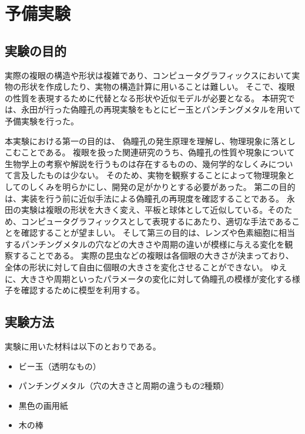 \chapter{予備実験}
\label{CExperiment}

\section{実験の目的}
\label{SExperimentPurpose}


実際の複眼の構造や形状は複雑であり、コンピュータグラフィックスにおいて実物の形状を作成したり、実物の構造計算に用いることは難しい。
そこで、複眼の性質を表現するために代替となる形状や近似モデルが必要となる。
本研究では、永田\cite{永田敏夫:2008-03-10}が行った偽瞳孔の再現実験をもとにビー玉とパンチングメタルを用いて予備実験を行った。

本実験における第一の目的は、 偽瞳孔の発生原理を理解し、物理現象に落としこむことである。
複眼を扱った関連研究のうち、偽瞳孔の性質や現象について生物学上の考察や解説を行うものは存在するものの、幾何学的なしくみについて言及したものは少ない。
そのため、実物を観察することによって物理現象としてのしくみを明らかにし、開発の足がかりとする必要があった。
第二の目的は、実装を行う前に近似手法による偽瞳孔の再現度を確認することである。
永田の実験は複眼の形状を大きく変え、平板と球体として近似している。そのため、コンピュータグラフィックスとして表現するにあたり、適切な手法であることを確認することが望ましい。
そして第三の目的は、レンズや色素細胞に相当するパンチングメタルの穴などの大きさや周期の違いが模様に与える変化を観察することである。
実際の昆虫などの複眼は各個眼の大きさが決まっており、全体の形状に対して自由に個眼の大きさを変化させることができない。
ゆえに、大きさや周期といったパラメータの変化に対して偽瞳孔の模様が変化する様子を確認するために模型を利用する。

\section{実験方法}
\label{SExperimentMethod}

実験に用いた材料は以下のとおりである。

\begin{itemize}
\item ビー玉（透明なもの）
\item パンチングメタル（穴の大きさと周期の違うもの2種類）
\item 黒色の画用紙
\item 木の棒
\end{itemize}

